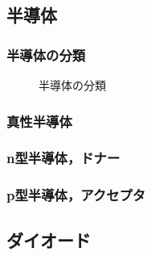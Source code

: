     \subsection{半導体}
        \subsubsection{半導体の分類}
        \begin{figure}[hbt]
            \begin{center}
                \caption{半導体の分類}
                \label{fig:handoutai_bunrui2}
            \end{center}
        \end{figure}

        \subsubsection{真性半導体}

        \subsubsection{n型半導体，ドナー}

        \subsubsection{p型半導体，アクセプタ}

    \subsection{ダイオード}

